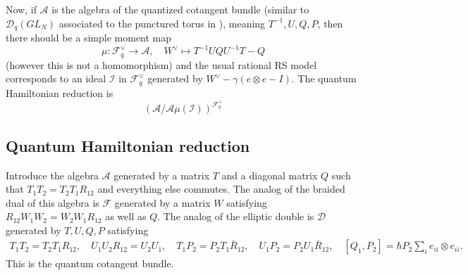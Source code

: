 \documentclass[11pt]{report}
\theoremstyle{definition}
\theoremstyle{remark}
\theoremstyle{remark}
\begin{document}
Now, if $\mathcal{A}$ is the algebra of the quantized cotangent bundle (similar to $\mathcal{D}_q(GL_N)$ associated to the punctured torus in \cite{article:benzvi2:2018}), meaning $T^{-1},U,Q,P$, then there should be a simple moment map
\begin{equation*}
\mu: \mathcal{F}_q^\vee \to \mathcal{A}, \quad W^\vee \mapsto T^{-1} U Q U^{-1} T - Q
\end{equation*}
(however this is not a homomorphism) and the usual rational RS model corresponds to an ideal $\mathcal{I}$ in $\mathcal{F}_q^\vee$ generated by $W^\vee - \gamma(e \otimes e - I)$. The quantum Hamiltonian reduction is
\begin{equation*}
(\mathcal{A}/\mathcal{A} \mu(\mathcal{I}))^{\mathcal{F}_q^\vee}
\end{equation*}

\subsection{Quantum Hamiltonian reduction}

Introduce the algebra $\mathcal{A}$ generated by a matrix $T$ and a diagonal matrix $Q$ such that $T_1 T_2 = T_2 T_1 R_{12}$ and everything else commutes. The analog of the braided dual of this algebra is $\mathcal{F}$ generated by a matrix $W$ satisfying $R_{12} W_1 W_2 = W_2 W_1 R_{12}$ as well as $Q$. The analog of the elliptic double is $\mathcal{D}$ generated by $T, U, Q, P$ satisfying
\begin{align*}
T_1 T_2 = T_2 T_1 R_{12}, \quad U_1 U_2 R_{12} = U_2 U_1, \quad T_1 P_2 = P_2 T_1 \bar R_{12}, \quad U_1 P_2 = P_2 U_1 \bar R_{12}, \quad [Q_1,P_2] = \hbar P_2 \sum_i e_{ii} \otimes e_{ii}.
\end{align*}
This is the quantum cotangent bundle.
\end{document}
